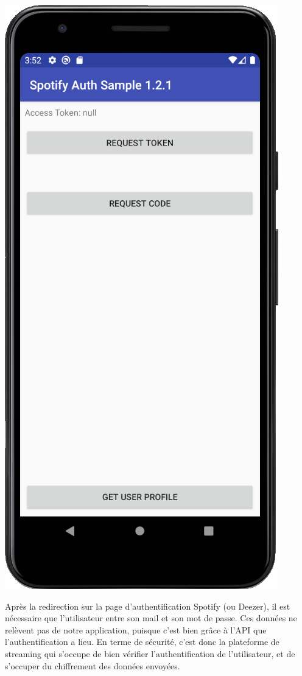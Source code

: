 \documentclass[12pt, openany]{report}
\begin{document}
    \includegraphics[scale=0.5]{images/recupinfos.png}
    
    \newpage
    
    Après la redirection sur la page d'authentification Spotify (ou Deezer), il est nécessaire que l'utilisateur entre son mail et son mot de passe. Ces données ne relèvent pas de notre application, puisque c'est bien grâce à l'API que l'authentification a lieu. En terme de sécurité, c'est donc la plateforme de streaming qui s'occupe de bien vérifier l'authentification de l'utilisateur, et de s'occuper du chiffrement des données envoyées. \cite{Auth}
    \\
    \\
    
\end{document}
